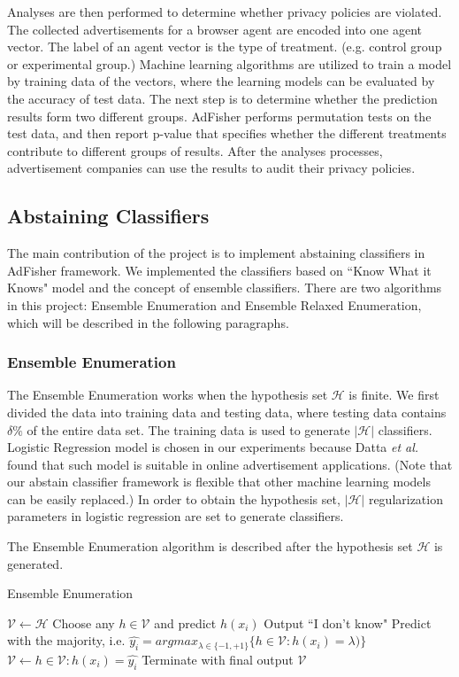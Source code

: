 \documentclass[12pt, journal]{IEEEtran}
\begin{document}
Analyses are then performed to determine whether privacy policies are violated.
The collected advertisements for a browser agent are encoded into one agent vector.
The label of an agent vector is the type of treatment. (e.g. control group or experimental group.)
Machine learning algorithms are utilized to train a model by training data of the vectors, where the learning models can be evaluated by the accuracy of test data.
The next step is to determine whether the prediction results form two different groups.
AdFisher performs permutation tests on the test data, and then report p-value that specifies whether the different treatments contribute to different groups of results.  
After the analyses processes, advertisement companies can use the results to audit their privacy policies.

\subsection{Abstaining Classifiers}
The main contribution of the project is to implement abstaining classifiers in AdFisher framework.
We implemented the classifiers based on ``Know What it Knows" model and the concept of ensemble classifiers.
There are two algorithms in this project: Ensemble Enumeration and Ensemble Relaxed Enumeration, which will be described in the following paragraphs.

\subsubsection{Ensemble Enumeration} 
The Ensemble Enumeration works when the hypothesis set $\mathcal{H}$ is finite.
We first divided the data into training data and testing data, where testing data contains $ \delta \%$ of the entire data set. 
The training data is used to generate $|\mathcal{H}|$ classifiers.
Logistic Regression model is chosen in our experiments because Datta \textit{et al.} \cite{datta} found that such model is suitable in online advertisement applications.
(Note that our abstain classifier framework is flexible that other machine learning models can be easily replaced.)
In order to obtain the hypothesis set, $|\mathcal{H}|$ regularization parameters in logistic regression are set to generate classifiers.

The Ensemble Enumeration algorithm is described after the hypothesis set $\mathcal{H}$ is generated.
\begin{algorithm}[h]
  \caption{Ensemble Enumeration}
  \begin{algorithmic}[1]
   \State $\mathcal{V} \gets \mathcal{H}$  
      \State Choose any $h \in \mathcal{V}$ and predict $h(x_i)$
      \Else 
      \State Output ``I don't know"
      \State Predict with the majority, i.e. $\hat{y_{i}} = argmax_{\lambda\in \{-1,+1\} } \{h \in \mathcal{V}: h(x_i)=\lambda)\}$
      \State $\mathcal{V} \gets {h \in \mathcal{V}:h(x_i)=\hat{y_{i}}}$
      \EndIf
      \State Terminate with final output $\mathcal{V}$
      \EndIf
    \EndFor
  \end{algorithmic}
\end{algorithm}
\end{document}
